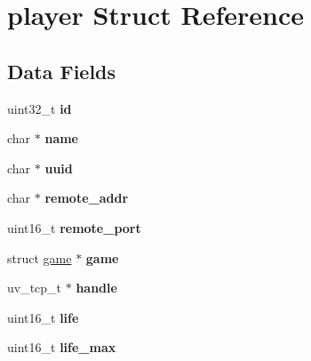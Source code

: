 \hypertarget{structplayer}{}\section{player Struct Reference}
\label{structplayer}
\subsection*{Data Fields}
\begin{DoxyCompactItemize}
\item 
\hypertarget{structplayer_a20a8b71abf065fcbfdcffcfb247f9612}{}uint32\+\_\+t {\bfseries id}\label{structplayer_a20a8b71abf065fcbfdcffcfb247f9612}

\item 
\hypertarget{structplayer_a27bb715521eb5315f3b6238d11061817}{}char $\ast$ {\bfseries name}\label{structplayer_a27bb715521eb5315f3b6238d11061817}

\item 
\hypertarget{structplayer_aa2c380993fe7ba8c4c247915e4c53b7b}{}char $\ast$ {\bfseries uuid}\label{structplayer_aa2c380993fe7ba8c4c247915e4c53b7b}

\item 
\hypertarget{structplayer_a9883369f926cc8638619e5c5ca32587f}{}char $\ast$ {\bfseries remote\+\_\+addr}\label{structplayer_a9883369f926cc8638619e5c5ca32587f}

\item 
\hypertarget{structplayer_ab9ec8fd2f6488fab4f263af23675ac6c}{}uint16\+\_\+t {\bfseries remote\+\_\+port}\label{structplayer_ab9ec8fd2f6488fab4f263af23675ac6c}

\item 
\hypertarget{structplayer_ab24a94003dd90ac35aa3b04c7b89b5d1}{}struct \hyperlink{structgame}{game} $\ast$ {\bfseries game}\label{structplayer_ab24a94003dd90ac35aa3b04c7b89b5d1}

\item 
\hypertarget{structplayer_ad30be0c2eb5007d557b62edd8a48acee}{}uv\+\_\+tcp\+\_\+t $\ast$ {\bfseries handle}\label{structplayer_ad30be0c2eb5007d557b62edd8a48acee}

\item 
\hypertarget{structplayer_aec0497f5466cbda947c094831f80efcf}{}uint16\+\_\+t {\bfseries life}\label{structplayer_aec0497f5466cbda947c094831f80efcf}

\item 
\hypertarget{structplayer_a4c808f0c87ab56e81c90f1a120661d57}{}uint16\+\_\+t {\bfseries life\+\_\+max}\label{structplayer_a4c808f0c87ab56e81c90f1a120661d57}


\end{DoxyCompactItemize}
